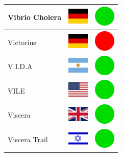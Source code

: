\documentclass[12pt, a4paper, twoside]{report}
\begin{document}
\begin{center}
\begin{longtable}{|p{5cm}|p{2cm}|p{2cm}|}
 Vibrio Cholera                                             & \includegraphics[width=1cm]{../4x3/de} &   \includegraphics[width=1cm]{../likes/y} \\ \hline
 Victorius                                                  & \includegraphics[width=1cm]{../4x3/de} &   \includegraphics[width=1cm]{../likes/n} \\ \hline
 V.I.D.A                                                    & \includegraphics[width=1cm]{../4x3/ar} &   \includegraphics[width=1cm]{../likes/y} \\ \hline
 VILE                                                       & \includegraphics[width=1cm]{../4x3/us} &   \includegraphics[width=1cm]{../likes/y} \\ \hline
 Viscera                                                    & \includegraphics[width=1cm]{../4x3/gb} &   \includegraphics[width=1cm]{../likes/y} \\ \hline
 Viscera Trail                                              & \includegraphics[width=1cm]{../4x3/il} &   \includegraphics[width=1cm]{../likes/y} \\ \hline

\end{longtable}
\end{center}
\end{document}

